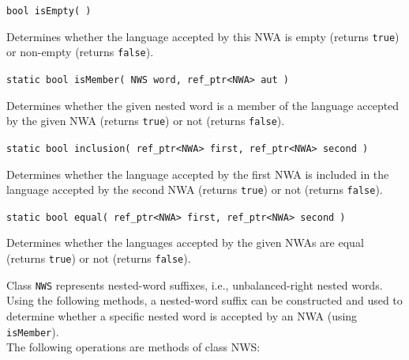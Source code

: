 \documentclass{llncs}
\begin{document}
\begin{description}

  \item\texttt{bool isEmpty( )}

    Determines whether the language accepted by this NWA is empty (returns \texttt{true}) or non-empty (returns \texttt{false}).

  \item\texttt{static bool isMember( NWS word, ref\_ptr<NWA> aut )}

    Determines whether the given nested word is a member of the language accepted by the given NWA (returns \texttt{true}) or not (returns \texttt{false}).

  \item\texttt{static bool inclusion( ref\_ptr<NWA> first, ref\_ptr<NWA> second )}

    Determines whether the language accepted by the first NWA is included in the language accepted by the second NWA (returns \texttt{true}) or not (returns \texttt{false}).

  \item\texttt{static bool equal( ref\_ptr<NWA> first, ref\_ptr<NWA> second )}

    Determines whether the languages accepted by the given NWAs are equal (returns \texttt{true}) or not (returns \texttt{false}). \\

\end{description}

Class \texttt{NWS} represents nested-word suffixes, i.e., unbalanced-right nested words. Using the following methods, a nested-word suffix can be constructed and used to determine whether a specific nested word is accepted by an NWA (using \texttt{isMember}). \\

\noindent The following operations are methods of class NWS:
\end{document}
